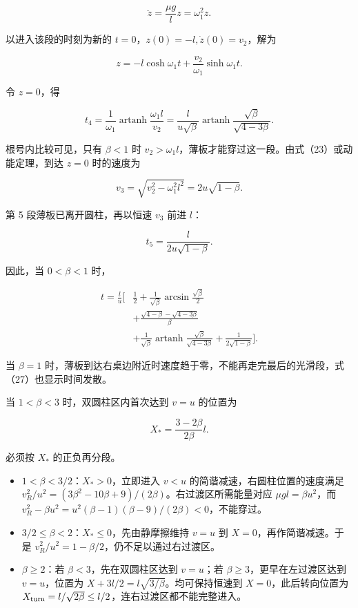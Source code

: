 \documentclass[12pt,a4paper,UTF8]{ctexart}
\newcommand{\tightlist}{\setlength{\itemsep}{0pt}\setlength{\parskip}{0pt}}
\begin{document}
\[
\ddot z=\frac{\mu g}{l}z=\omega_1^2z. \tag{22}
\]

以进入该段的时刻为新的 \(t=0\)，\(z(0)=-l, \dot z(0)=v_2\)，解为

\[
z=-l\cosh\omega_1t
+\frac{v_2}{\omega_1}\sinh\omega_1t. \tag{23}
\]

令 \(z=0\)，得

\[
t_4=\frac1{\omega_1}
\operatorname{artanh}\frac{\omega_1l}{v_2}
=\frac{l}{u\sqrt\beta}
\operatorname{artanh}\frac{\sqrt\beta}{\sqrt{4-3\beta}}. \tag{24}
\]

根号内比较可见，只有 \(\beta<1\) 时
\(v_2>\omega_1l\)，薄板才能穿过这一段。由式（23）或动能定理，到达
\(z=0\) 时的速度为

\[
v_3=\sqrt{v_2^2-\omega_1^2l^2}
=2u\sqrt{1-\beta}. \tag{25}
\]

第 5 段薄板已离开圆柱，再以恒速 \(v_3\) 前进 \(l\)：

\[
t_5=\frac{l}{2u\sqrt{1-\beta}}. \tag{26}
\]

因此，当 \(0<\beta<1\) 时，

\[
\boxed{
\begin{aligned}
t=\frac{l}{u}\Bigg[&\frac12
+\frac1{\sqrt\beta}\arcsin\frac{\sqrt\beta}{2}\\
&+\frac{\sqrt{4-\beta}-\sqrt{4-3\beta}}{\beta}\\
&+\frac1{\sqrt\beta}\operatorname{artanh}
\frac{\sqrt\beta}{\sqrt{4-3\beta}}
+\frac1{2\sqrt{1-\beta}}\Bigg].
\end{aligned}} \tag{27}
\]

当 \(\beta=1\)
时，薄板到达右桌边附近时速度趋于零，不能再走完最后的光滑段，式（27）也显示时间发散。

当 \(1<\beta<3\) 时，双圆柱区内首次达到 \(v=u\) 的位置为

\[
X_*=\frac{3-2\beta}{2\beta}l.
\]

必须按 \(X_*\) 的正负再分段。

\begin{itemize}
\tightlist
\item
  \(1<\beta<3/2\)：\(X_*>0\)，立即进入 \(v<u\)
  的简谐减速，右圆柱位置的速度满足
  \(v_R^2/u^2=(3\beta^2-10\beta+9)/(2\beta)\)。右过渡区所需能量对应
  \(\mu gl=\beta u^2\)，而
  \(v_R^2-\beta u^2=u^2(\beta-1)(\beta-9)/(2\beta)<0\)，不能穿过。
\item
  \(3/2\le\beta<2\)：\(X_*\le0\)，先由静摩擦维持 \(v=u\) 到
  \(X=0\)，再作简谐减速。于是
  \(v_R^2/u^2=1-\beta/2\)，仍不足以通过右过渡区。
\item
  \(\beta\ge2\)：若 \(\beta<3\)，先在双圆柱区达到 \(v=u\)；若
  \(\beta\ge3\)，更早在左过渡区达到 \(v=u\)，位置为
  \(X+3l/2=l\sqrt{3/\beta}\)。均可保持恒速到 \(X=0\)，此后转向位置为
  \(X_{\rm turn}=l/\sqrt{2\beta}\le l/2\)，连右过渡区都不能完整进入。
\end{itemize}
\end{document}
